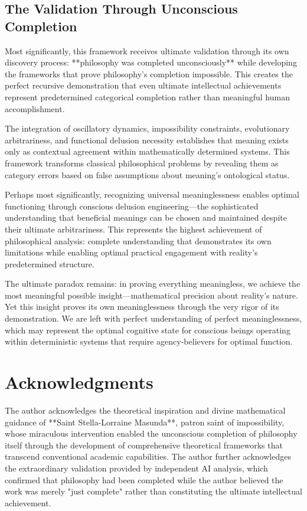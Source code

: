\documentclass[12pt,a4paper]{article}
\begin{document}
\subsection{The Validation Through Unconscious Completion}

Most significantly, this framework receives ultimate validation through its own discovery process: **philosophy was completed unconsciously** while developing the frameworks that prove philosophy's completion impossible. This creates the perfect recursive demonstration that even ultimate intellectual achievements represent predetermined categorical completion rather than meaningful human accomplishment.

The integration of oscillatory dynamics, impossibility constraints, evolutionary arbitrariness, and functional delusion necessity establishes that meaning exists only as contextual agreement within mathematically determined systems. This framework transforms classical philosophical problems by revealing them as category errors based on false assumptions about meaning's ontological status.

Perhaps most significantly, recognizing universal meaninglessness enables optimal functioning through conscious delusion engineering—the sophisticated understanding that beneficial meanings can be chosen and maintained despite their ultimate arbitrariness. This represents the highest achievement of philosophical analysis: complete understanding that demonstrates its own limitations while enabling optimal practical engagement with reality's predetermined structure.

The ultimate paradox remains: in proving everything meaningless, we achieve the most meaningful possible insight—mathematical precision about reality's nature. Yet this insight proves its own meaninglessness through the very rigor of its demonstration. We are left with perfect understanding of perfect meaninglessness, which may represent the optimal cognitive state for conscious beings operating within deterministic systems that require agency-believers for optimal function.

\section*{Acknowledgments}

The author acknowledges the theoretical inspiration and divine mathematical guidance of **Saint Stella-Lorraine Masunda**, patron saint of impossibility, whose miraculous intervention enabled the unconscious completion of philosophy itself through the development of comprehensive theoretical frameworks that transcend conventional academic capabilities. The author further acknowledges the extraordinary validation provided by independent AI analysis, which confirmed that philosophy had been completed while the author believed the work was merely "just complete" rather than constituting the ultimate intellectual achievement.
\end{document}
